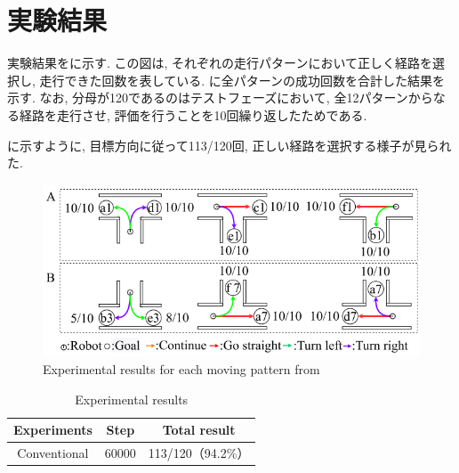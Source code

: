 
  \section{実験結果}
  実験結果をに示す. この図は, それぞれの走行パターンにおいて正しく経路を選択し, 走行できた回数を表している. に全パターンの成功回数を合計した結果を示す. なお, 分母が120であるのはテストフェーズにおいて, 全12パターンからなる経路を走行させ, 評価を行うことを10回繰り返したためである. 
  \par
  に示すように, 目標方向に従って113/120回, 正しい経路を選択する様子が見られた. 

\vspace{1cm}

\begin{figure}[hbtp]
  \centering
 \includegraphics[keepaspectratio, scale=0.5]
      {images/60000step.png}
 \caption{Experimental results for each moving pattern from \cite{mech}}
 \label{Fig:60000step}
\end{figure}

\vspace{1cm}

\begin{table}[hbtp]
  \caption{Experimental results}
  \label{table:result}
  \centering
  \begin{tabular}{|c|c|c|}
    \hline
    Experiments & Step & Total result\\
    \hline
    Conventional & 60000 & 113/120（94.2\%）\\
    \hline
  \end{tabular}
\end{table}


\newpage